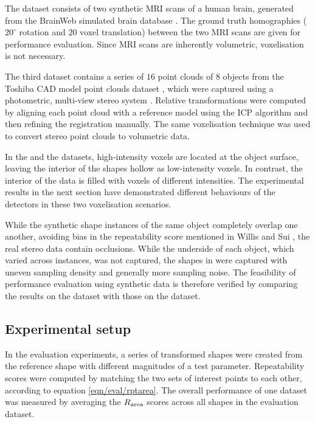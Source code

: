 The \mriset dataset consists of two synthetic MRI scans of a human brain, generated from the BrainWeb simulated brain database \cite{Cocosco1997}. The ground truth homographies ($20^{\circ}$ rotation and $20$ voxel translation) between the two MRI scans are given for performance evaluation. Since MRI scans are inherently volumetric, voxelisation is not necessary. 

The third \stereoset dataset contains a series of $16$ point clouds of $8$ objects from the Toshiba CAD model point clouds dataset \cite{Pham2011}, which were captured using a photometric, multi-view stereo system \cite{Vogiatzis2011}. Relative transformations were computed by aligning each point cloud with a reference model using the ICP algorithm \cite{Besl1992} and then refining the registration manually. The same voxelisation technique was used to convert stereo point clouds to volumetric data.

In the \meshset and the \stereoset datasets, high-intensity voxels are located at the object surface, leaving the interior of the shapes hollow as low-intensity voxels. In contrast, the interior of the \mriset data is filled with voxels of different intensities. The experimental results in the next section have demonstrated different behaviours of the detectors in these two voxelisation scenarios.

While the synthetic shape instances of the same object completely overlap one another, avoiding bias in the repeatability score mentioned in Willis and Sui \cite{Willis2009}, the real stereo data contain occlusions. While the underside of each object, which varied across instances, was not captured, the shapes in \stereoset were captured with uneven sampling density and generally more sampling noise. The feasibility of performance evaluation using synthetic data is therefore verified by comparing the results on the \meshset dataset with those on the \stereoset dataset. 




\subsection{Experimental setup}
\label{sec/eval/variation}
In the evaluation experiments, a series of transformed shapes were created from the reference shape with different magnitudes of a test parameter. Repeatability scores were computed by matching the two sets of interest points to each other, according to equation \ref{eqn/eval/rptarea}. The overall performance of one dataset was measured by averaging the $R_\textrm{area}$ scores across all shapes in the evaluation dataset. 

